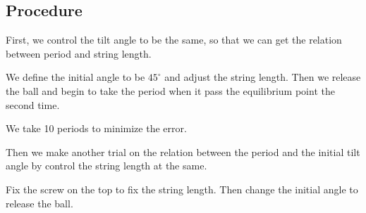 \documentclass[12pt]{report}
\begin{document}
\subsection{Procedure}
First, we control the tilt angle to be the same, so that we can get the relation between period and string length.

We define the initial angle to be $45^\circ$ and adjust the string length. Then we release the ball and begin to take the period when it pass the equilibrium point the second time.

We take 10 periods to minimize the error.

Then we make another trial on the relation between the period and the initial tilt angle by control the string length at the same.

Fix the screw on the top to fix the string length. Then change the initial angle to release the ball.
\end{document}
